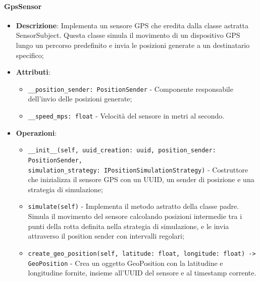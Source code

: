 \documentclass[10pt]{article}
\begin{document}
    \paragraph{GpsSensor}
    \begin{itemize} 
    \item \textbf{Descrizione}: Implementa un sensore GPS che eredita dalla classe astratta SensorSubject. Questa classe simula il movimento di un dispositivo GPS lungo un percorso predefinito e invia le posizioni generate a un destinatario specifico;
    \item \textbf{Attributi}:
    \begin{itemize}
        \item \texttt{\_\_position\_sender: PositionSender} - Componente responsabile dell'invio delle posizioni generate;
        \item \texttt{\_\_speed\_mps: float} - Velocità del sensore in metri al secondo.
    \end{itemize}
    
    \item \textbf{Operazioni}:
    \begin{itemize}
        \item \texttt{\_\_init\_\_(self, uuid\_creation: uuid, position\_sender: PositionSender, \\ simulation\_strategy: IPositionSimulationStrategy)} - Costruttore che inizializza il sensore GPS con un UUID, un sender di posizione e una strategia di simulazione;
        
        \item \texttt{simulate(self)} - Implementa il metodo astratto della classe padre. Simula il movimento del sensore calcolando posizioni intermedie tra i punti della rotta definita nella strategia di simulazione, e le invia attraverso il position sender con intervalli regolari;
        
        \item \texttt{create\_geo\_position(self, latitude: float, longitude: float) -> GeoPosition} - Crea un oggetto GeoPosition con la latitudine e longitudine fornite, insieme all'UUID del sensore e al timestamp corrente.
    \end{itemize}
    \end{itemize}
\end{document}
